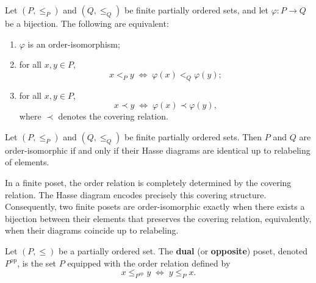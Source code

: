 
\begin{lemma}
Let $(P,\le_P)$ and $(Q,\le_Q)$ be finite partially ordered sets, and let $\varphi : P \to Q$ be a bijection. The following are equivalent:
\begin{enumerate}
    \item $\varphi$ is an order-isomorphism;
    
    \item for all $x,y \in P$,
    \[
    x <_P y \;\Longleftrightarrow\; \varphi(x) <_Q \varphi(y);
    \]
    
    \item for all $x,y \in P$,
    \[
    x \prec y \;\Longleftrightarrow\; \varphi(x) \prec \varphi(y),
    \]
    where $\prec$ denotes the covering relation.
\end{enumerate}
\end{lemma}


\begin{proposition}
Let $(P,\le_P)$ and $(Q,\le_Q)$ be finite partially ordered sets. Then $P$ and $Q$ are order-isomorphic if and only if their Hasse diagrams are identical up to relabeling of elements.
\end{proposition}

\begin{remark}[Interpretation]
In a finite poset, the order relation is completely determined by the covering relation. The Hasse diagram encodes precisely this covering structure. Consequently, two finite posets are order-isomorphic exactly when there exists a bijection between their elements that preserves the covering relation, equivalently, when their diagrams coincide up to relabeling.
\end{remark}


\begin{definition}
Let $(P,\le)$ be a partially ordered set. The \textbf{dual} (or \textbf{opposite}) poset, denoted $P^{\mathrm{op}}$, is the set $P$ equipped with the order relation defined by
\[
x \le_{P^{\mathrm{op}}} y \;\Longleftrightarrow\; y \le_P x.
\]
\end{definition}

